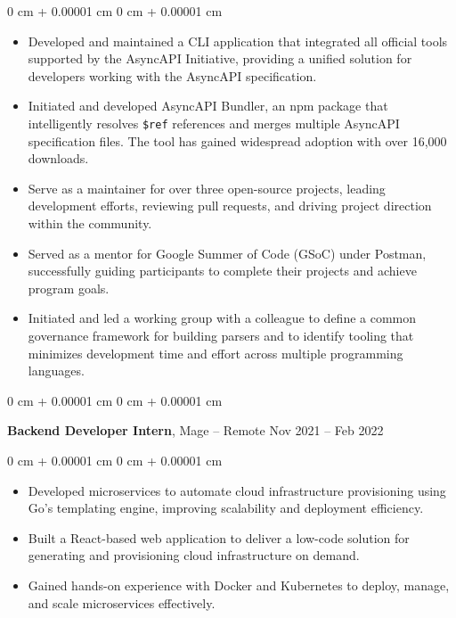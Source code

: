\documentclass[10pt, letterpaper]{article}
\newenvironment{highlights}{
    \begin{itemize}[
        topsep=0.10 cm,
        parsep=0.10 cm,
        partopsep=0pt,
        itemsep=0pt,
        leftmargin=0 cm + 10pt
    ]
}{
    \end{itemize}
} %
\newenvironment{onecolentry}{
    \begin{adjustwidth}{
        0 cm + 0.00001 cm
    }{
        0 cm + 0.00001 cm
    }
}{
    \end{adjustwidth}
} %
\newenvironment{twocolentry}[2][]{
    \onecolentry
    \def\secondColumn{#2}
    \setcolumnwidth{\fill, 4.5 cm}
    \begin{paracol}{2}
}{
    \switchcolumn \raggedleft \secondColumn
    \end{paracol}
    \endonecolentry
} %
\begin{document}
        \vspace{0.10 cm}
        \begin{onecolentry}
            \begin{highlights}
                \item Developed and maintained a CLI application that integrated all official tools supported by the AsyncAPI Initiative, providing a unified solution for developers working with the AsyncAPI specification.
                
                \item Initiated and developed AsyncAPI Bundler, an npm package that intelligently resolves \texttt{\$ref} references and merges multiple AsyncAPI specification files. The tool has gained widespread adoption with over 16,000 downloads.

                \item Serve as a maintainer for over three open-source projects, leading development efforts, reviewing pull requests, and driving project direction within the community.

                \item Served as a mentor for Google Summer of Code (GSoC) under Postman, successfully guiding participants to complete their projects and achieve program goals.

                \item Initiated and led a working group with a colleague to define a common governance framework for building parsers and to identify tooling that minimizes development time and effort across multiple programming languages.
                
                
            \end{highlights}
        \end{onecolentry}

        \vspace{0.2 cm}

        \begin{twocolentry}{
            Nov 2021 – Feb 2022
        }
            \textbf{Backend Developer Intern}, Mage -- Remote\end{twocolentry}

        \vspace{0.10 cm}
        \begin{onecolentry}
            \begin{highlights}
                \item Developed microservices to automate cloud infrastructure provisioning using Go’s templating engine, improving scalability and deployment efficiency.

                \item Built a React-based web application to deliver a low-code solution for generating and provisioning cloud infrastructure on demand.

                \item Gained hands-on experience with Docker and Kubernetes to deploy, manage, and scale microservices effectively.
                
            \end{highlights}
        \end{onecolentry}
    
\end{document}
